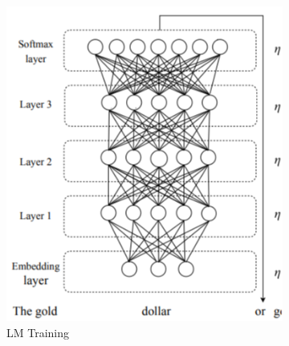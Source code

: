 
\begin{figure}
     \centering
     \begin{subfigure}[b]{0.3\textwidth}
         \centering
         \includegraphics[width=\textwidth]{images/ulm1.png}
         \caption{LM Training}
         \label{fig:lm_train}
     \end{subfigure}
     \begin{subfigure}[b]{0.3\textwidth}
         \centering

\end{subfigure}
\end{figure}
